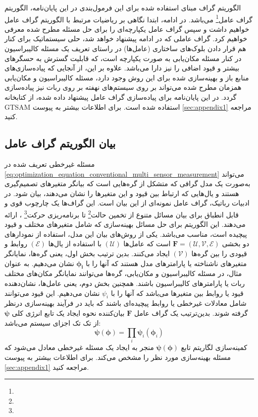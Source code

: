 الگوریتم گراف مبنای استفاده شده برای این فرمول‌بندی در این پایان‌نامه، الگوریتم گراف عامل\footnote{}
می‌باشد. در ادامه، ابتدا نگاهی بر ریاضیات مرتبط با الگوریتم گراف عامل خواهیم داشت و سپس گراف عامل یکپارچه‌ای را برای حل مسئله مطرح شده معرفی خواهیم کرد. گراف عاملی که در ادامه پیشنهاد خواهد شد، حلی سیستماتیک برای کنار هم قرار دادن بلوک‌های ساختاری (عامل‌ها) در راستای تعریف یک مسئله کالیبراسیون در کنار مسئله مکان‌یابی به صورت یکپارچه است، که قابلیت گسترش به حسگرهای بیشتر و قیود اضافی را نیز دارا می‌باشد. علاوه بر این، از آنجایی که پیاده‌سازی‌های منابع باز و بهینه‌سازی شده برای این روش وجود دارد، مسئله کالیبراسیون و مکان‌یابی همزمان مطرح شده می‌تواند بر روی سیستم‌های نهفته بر روی ربات نیز پیاده‌سازی گردد. در این پایان‌نامه برای پیاده‌سازی گراف عامل پیشنهاد داده شده، از کتابخانه GTSAM استفاده شده است. برای اطلاعات بیشتر به پیوست \ref{sec:appendix1} مراجعه کنید. 

\subsection{بیان الگوریتم گراف عامل}
مسئله غیرخطی تعریف شده در 
\ref{eq:optimization_equation_conventional_multi_sensor_measurement}
می‌تواند به‌صورت یک مدل گرافی که متشکل از گره‌هایی است که بیانگر متغیرهای تصمیم‌گیری هستند و یال‌هایی که ارتباط بین قیود و این متغیرها را نشان می‌دهند، بیان شود. در ادبیات رباتیک، گراف عامل نمونه‌ای از این بیان است. این گراف‌ها یک چارچوب قوی و قابل انطباق برای بیان مسائل متنوع از تخمین حالت\footnote{}
 تا برنامه‌ریزی حرکت\footnote{}
 ، ارائه می‌دهند.  این الگوریتم برای حل مسائل بهینه‌سازی که شامل متغیرهای مختلف و قیود پیچیده است، مناسب می‌باشد. یکی از روش‌های بیان این مدل، استفاده از نمودارهای دو بخشی
$\boldsymbol{F} = (\mathcal{U}, \mathcal{V}, \mathcal{E})$
است که  عامل‌ها 
$(\mathcal{U})$
با استفاده از یال‌ها
$(\mathcal{E})$
روابط و قیودی را بین گره‌ها 
$(\mathcal{V})$
 ایجاد می‌کنند. بدین ترتیب بخش اول، یعنی گره‌ها، نمایانگر متغیرهای ناشناخته یا پارامترهای مدل هستند که آنها را با
$\boldsymbol{\phi_i}$
نشان می‌دهیم. به عنوان مثال، در مسئله کالیبراسیون و مکان‌یابی، گره‌ها می‌توانند نمایانگر مکان‌های مختلف ربات یا پارامترهای کالیبراسیون باشند. همچنین بخش دوم، یعنی عامل‌ها، نشان‌دهنده قیود یا روابط بین متغیرها می‌باشد که آنها را با
$\psi_i$
نشان می‌دهیم. این قیود می‌توانند شامل معادلات غیرخطی یا روابط پیچیده‌ای باشند که باید در فرآیند بهینه‌سازی درنظر گرفته شوند. بدین‌ترتیب یک گراف عامل 
$\boldsymbol{F}$
بیان‌کننده نحوه ایجاد یک تابع انرژی کلی
$\boldsymbol{\psi}$
از تک تک اجزای سیستم می‌باشد:
\begin{equation} 
	\boldsymbol{\psi}(\boldsymbol{\phi}) = \prod_{i} \boldsymbol{\psi}_i(\boldsymbol{\phi}_i) 
\end{equation}
کمینه‌سازی لگاریتم تابع 
$\boldsymbol{\psi}(\boldsymbol{\phi})$
منجر به ایجاد یک مسئله غیرخطی معادل می‌شود که مسئله بهینه‌سازی مورد نظر را مشخص می‌کند. برای اطلاعات بیشتر به پیوست \ref{sec:appendix1} مراجعه کنید.

